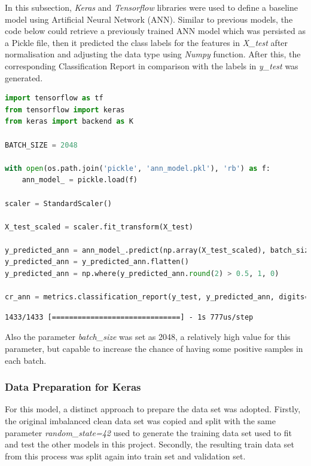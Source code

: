 \documentclass{article}
\begin{document}
In this subsection, \emph{Keras} and \emph{Tensorflow} libraries were used to define a baseline model using Artificial Neural Network (ANN). Similar to previous models, the code below could retrieve a previously trained ANN model which was persisted as a Pickle file, then it predicted the class labels for the features in \emph{X\_test} after normalisation and adjusting the data type using \emph{Numpy} function. After this, the corresponding Classification Report in comparison with the labels in \emph{y\_test} was generated. 

\begin{lstlisting}[language=Python]
import tensorflow as tf
from tensorflow import keras
from keras import backend as K

BATCH_SIZE = 2048

with open(os.path.join('pickle', 'ann_model.pkl'), 'rb') as f: 
    ann_model_ = pickle.load(f)
    
scaler = StandardScaler()    

X_test_scaled = scaler.fit_transform(X_test)

y_predicted_ann = ann_model_.predict(np.array(X_test_scaled), batch_size=BATCH_SIZE)
y_predicted_ann = y_predicted_ann.flatten()
y_predicted_ann = np.where(y_predicted_ann.round(2) > 0.5, 1, 0)

cr_ann = metrics.classification_report(y_test, y_predicted_ann, digits=5)    
\end{lstlisting}
\begin{verbatim}
1433/1433 [==============================] - 1s 777us/step
\end{verbatim}

Also the parameter \emph{batch\_size} was set as 2048, a relatively high value for this parameter, but capable to increase the chance of having some positive samples in each batch.

\subsubsection{Data Preparation for Keras}

For this model, a distinct approach to prepare the data set was adopted. Firstly, the original imbalanced clean data set was copied and split with the same parameter \emph{random\_state=42} used to generate the training data set used to fit and test the other models in this project. Secondly, the resulting train data set from this process was split again into train set and validation set.
\end{document}
